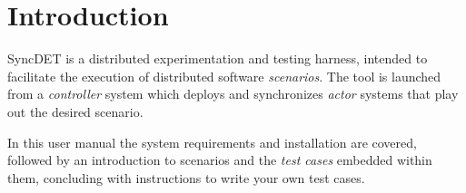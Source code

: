 \section{Introduction}

SyncDET is a distributed experimentation and testing harness, intended to
facilitate the execution of distributed software {\em scenarios}. The tool
is launched from a {\em controller} system which deploys and synchronizes {\em
actor} systems that play out the desired scenario.

In this user manual the system requirements and installation are covered,
followed by an introduction to scenarios and the {\em test cases} embedded
within them, concluding with instructions to write your own test cases.


